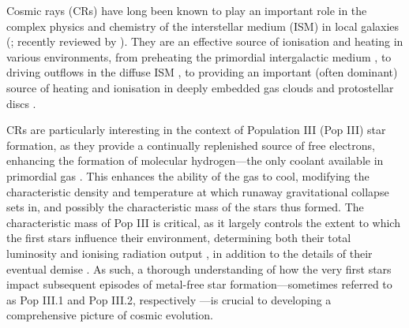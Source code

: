 \documentclass[usenatbib]{mn2e}
\begin{document}
Cosmic rays (CRs) have long been known to play an important role in the complex physics and chemistry of the interstellar medium (ISM) in local galaxies (\citealt{SpitzerTomasko1968,SpitzerScott1969,GlassgoldLanger1973,GoldsmithLanger1978,CravensDalgarno1978,MannheimSchlickeiser1994,Tielens2005}; recently reviewed by \citealt{StrongMoskalenkoPtuskin2007,GrenierBlackStrong2015}).  
They are an effective source of ionisation and heating in various environments, from preheating the primordial intergalactic medium  \citep[IGM;][]{SazonovSunyaev2015}, to driving outflows in the diffuse ISM \citep[e.g.,][]{Ensslinetal2007,Jubelgasetal2008,SalemBryan2014,Hanaszetal2013,Boothetal2013,SalemBryanHummels2014}, to providing an important (often dominant) source of heating and ionisation in deeply embedded gas clouds and protostellar discs \citep{Spitzer1978,DalgarnoYanLiu1999,IndrioloFieldsMcCall2009,PadovaniGalliGlassgold2009,GlassgoldGalliPadovani2012,PadovaniHennebelleGalli2013,Padovanietal2015}. 

CRs are particularly interesting in the context of Population III (Pop III) star formation, as they provide a continually replenished source of free electrons, enhancing the formation of molecular hydrogen---the only coolant available in primordial gas \citep{LeppShull1984,Abeletal1997,GalliPalla1998,BrommCoppiLarson2002,GloverAbel2008}.  
This enhances the ability of the gas to cool, modifying the characteristic density and temperature at which runaway gravitational collapse sets in, and possibly the characteristic mass of the stars thus formed.   
The characteristic mass of Pop III is critical, as it largely controls the extent to which the first stars influence their environment, determining both their total luminosity and ionising radiation output \citep{Schaerer2002}, in addition to the details of their eventual demise \citep{Hegeretal2003,HegerWoosley2010,MaederMeynet2012}. 
As such, a thorough understanding of how the very first stars impact subsequent episodes of metal-free star formation---sometimes referred to as Pop III.1 and Pop III.2, respectively \citep{McKeeTan2008}---is crucial to developing a comprehensive picture of cosmic evolution.
\end{document}
